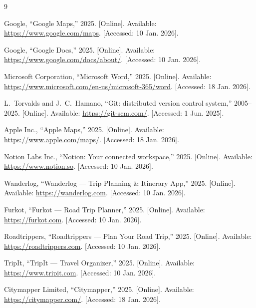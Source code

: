 \documentclass[pdftex,10pt,a4paper,oneside]{article}
\numberwithin{equation}{section} %
\begin{document}












\begin{thebibliography}{9}

Google, ``Google Maps,'' 2025. [Online]. Available: \url{https://www.google.com/maps}. [Accessed: 10 Jan. 2026].

Google, ``Google Docs,'' 2025. [Online]. Available: \url{https://www.google.com/docs/about/}. [Accessed: 10 Jan. 2026].

Microsoft Corporation, ``Microsoft Word,'' 2025. [Online]. Available: \url{https://www.microsoft.com/en-us/microsoft-365/word}. [Accessed: 18 Jan. 2026].

L.~Torvalds and J.~C.~Hamano, ``Git: distributed version control system,'' 2005--2025. [Online].
Available: \url{https://git-scm.com/}. [Accessed: 1 Jun. 2025].

Apple Inc., ``Apple Maps,'' 2025. [Online]. Available: \url{https://www.apple.com/maps/}. [Accessed: 18 Jan. 2026].

Notion Labs Inc., ``Notion: Your connected workspace,'' 2025. [Online]. Available: \url{https://www.notion.so}. [Accessed: 10 Jan. 2026].

Wanderlog, ``Wanderlog --- Trip Planning \& Itinerary App,'' 2025. [Online]. Available: \url{https://wanderlog.com}. [Accessed: 10 Jan. 2026].

Furkot, ``Furkot --- Road Trip Planner,'' 2025. [Online]. Available: \url{https://furkot.com}. [Accessed: 10 Jan. 2026].

Roadtrippers, ``Roadtrippers --- Plan Your Road Trip,'' 2025. [Online]. Available: \url{https://roadtrippers.com}. [Accessed: 10 Jan. 2026].

TripIt, ``TripIt --- Travel Organizer,'' 2025. [Online]. Available: \url{https://www.tripit.com}. [Accessed: 10 Jan. 2026].

Citymapper Limited, ``Citymapper,'' 2025. [Online]. Available: \url{https://citymapper.com/}. [Accessed: 18 Jan. 2026].


\end{thebibliography}
\end{document}
